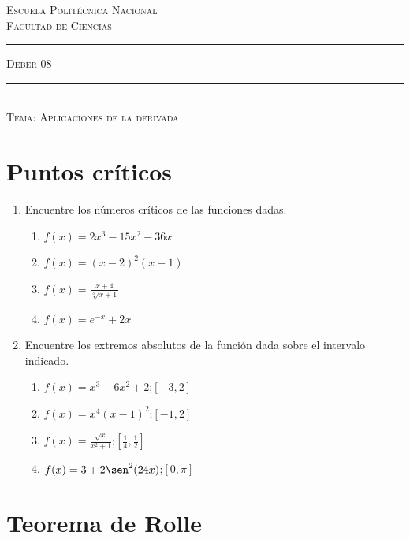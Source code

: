 \documentclass[11pt,a4paper,oneside]{article}\usepackage[]{graphicx}\usepackage[]{color}
\begin{document}
\thispagestyle{empty}
{\sf
{\huge \scshape Escuela Polit\'{e}cnica Nacional} \\[5mm]
{\Large \scshape Facultad de Ciencias}\hfill \rule{0.05\textwidth}{0.5pt} {\scshape Deber 08} \rule{0.05\textwidth}{0.5pt}\\[8mm]
{\scshape Tema: Aplicaciones de la derivada}\\
}

\section{Puntos críticos}

\begin{enumerate}
      \item Encuentre los números críticos de las funciones dadas.
      \begin{multicols}{2}
      \begin{enumerate}
            \item $f(x)=2x^3-15x^2-36x$
            \item $f(x)=(x-2)^2(x-1)$
            \item $f(x)=\displaystyle \frac{x+4}{\sqrt[3]{x+1}}$
            \item $f(x)=e^{-x}+2x$
      \end{enumerate}
      \end{multicols}
      
      \item Encuentre los extremos absolutos de la función dada sobre el intervalo indicado.
      \begin{multicols}{2}
      \begin{enumerate}
            \item $f(x)=x^3-6x^2+2$;\quad $[-3,2]$
            \item $f(x)=x^4(x-1)^2$;\quad $[-1,2]$
            \item $f(x)=\displaystyle \frac{\sqrt{x}}{x^2+1}$;\quad $[\frac{1}{4}, \frac{1}{2}]$
            \item $f(x)=3+2\sen^2 (24x)$;\quad $[0, \pi]$
      \end{enumerate}
      \end{multicols}
\end{enumerate}

\section{Teorema de Rolle}
\end{document}
